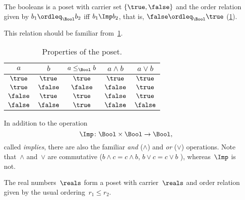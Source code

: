 \begin{example}[Booleans]
    \label{ex:bool}
    The booleans \index{\Bool} is a poset with carrier set $\{\true,\false\}$ and the order relation given by $b_1 \ordleq_\Bool b_2$ iff $b_1 \Imp b_2$, that is, $\false \ordleq_\Bool \true$ (\cref{fig:boolean}).

    \begin{figure}[h!]
        \centering
        \caption{\label{fig:boolean}}
    \end{figure}

    This relation should be familiar from~\cref{tab:boolposet}.

    \begin{table}[h!]
        \begin{center}
            \begin{tabular}{cc|ccc}
                $a$      & $b$      & $a \leq_\Bool b$ & $a \wedge b$ & $a \vee b$ \\ \hline
                $\true$  & $\true$  & $\true$          & $\true$      & $\true$    \\
                $\true$  & $\false$ & $\false$         & $\false$     & $\true$    \\
                $\false$ & $\true$  & $\true$          & $\false$     & $\true$    \\
                $\false$ & $\false$ & $\true$          & $\false$     & $\false$
            \end{tabular}
        \end{center}
        \caption{Properties of the \Bool poset. \label{tab:boolposet}}
    \end{table}

    In addition to the operation
    \begin{equation*}
        \Imp\colon\Bool\times \Bool\to\Bool,
    \end{equation*}
    called \emph{implies}, there are also the familiar \emph{and} ($\wedge$) and \emph{or} ($\vee$) operations. Note that~$\wedge$ and~$\vee$ are commutative ($b\wedge c = c\wedge b$, $b\vee c = c\vee b$ ), whereas~$\Imp$ is not.
\end{example}




\begin{example}[Reals]
    The real numbers~$\reals$ form a poset with carrier~$\reals$ and order relation given by the usual ordering~$r_1 \leq r_2$.
\end{example}

